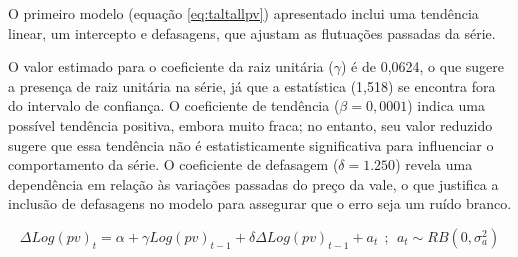 \documentclass[a4paper,12pt]{article}[abntex2]
\begin{document}
O primeiro modelo (equação \ref{eq:taltallpv}) apresentado inclui uma tendência linear, um intercepto e defasagens, que ajustam as flutuações passadas da série.

O valor estimado para o coeficiente da raiz unitária ($\gamma$) é de 0,0624, o que sugere a presença de raiz unitária na série, já que a estatística (1,518) se encontra fora do intervalo de confiança. O coeficiente de tendência ($\beta = 0,0001$) indica uma possível tendência positiva, embora muito fraca; no entanto, seu valor reduzido sugere que essa tendência não é estatisticamente significativa para influenciar o comportamento da série. O coeficiente de defasagem ($\delta = 1.250$) revela uma dependência em relação às variações passadas do preço da vale, o que justifica a inclusão de defasagens no modelo para assegurar que o erro seja um ruído branco.

\begin{equation}
    \Delta Log(pv)_t = \alpha + \gamma Log(pv)_{t-1} + \delta \Delta Log(pv)_{t-1} + a_t \ \ ; \ \ a_t \sim RB(0, \sigma_a^2)   
    \label{eq:talinterceptopv}
\end{equation}
\end{document}
